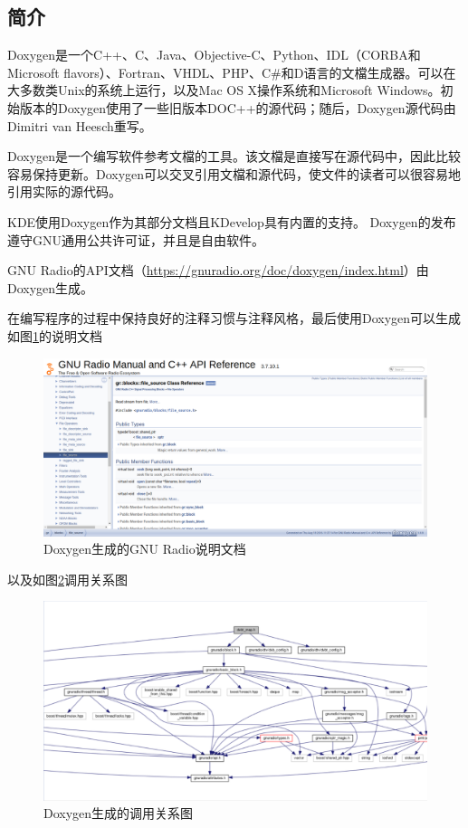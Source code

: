 	\subsection{简介}
	\par Doxygen是一个C++、C、Java、Objective-C、Python、IDL（CORBA和Microsoft flavors）、Fortran、VHDL、PHP、C\#和D语言的文檔生成器。可以在大多数类Unix的系统上运行，以及Mac OS X操作系统和Microsoft Windows。初始版本的Doxygen使用了一些旧版本DOC++的源代码；随后，Doxygen源代码由Dimitri van Heesch重写。
	\par Doxygen是一个编写软件参考文檔的工具。该文檔是直接写在源代码中，因此比较容易保持更新。Doxygen可以交叉引用文檔和源代码，使文件的读者可以很容易地引用实际的源代码。
	\par KDE使用Doxygen作为其部分文档且KDevelop具有内置的支持。 Doxygen的发布遵守GNU通用公共许可证，并且是自由软件。\cite{ wiki:Doxygen}
	\par GNU Radio的API文档（\href{https://gnuradio.org/doc/doxygen/index.html}{https://gnuradio.org/doc/doxygen/index.html}）由Doxygen生成。
	\par 在编写程序的过程中保持良好的注释习惯与注释风格，最后使用Doxygen可以生成如图\ref{fig:doxygen_gnuradio}的说明文档
	\begin{figure}[htb]
		\centering
		\includegraphics[width=13cm]{figures/doxygen_gnuradio.png}
		\caption{Doxygen生成的GNU Radio说明文档}
		\label{fig:doxygen_gnuradio}
	\end{figure}
	\par 以及如图\ref{fig:doxygen_dvbt_map}调用关系图
	\begin{figure}[htb]
		\centering
		\includegraphics[width=13cm]{figures/doxygen_dvbt_map.png}
		\caption{Doxygen生成的调用关系图}
		\label{fig:doxygen_dvbt_map}
	\end{figure}

